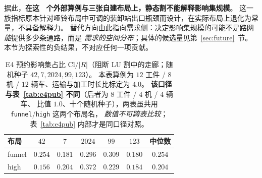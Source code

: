 据此，\textbf{在这 \NPubInst\ 个外部算例与三张自建布局上，静态割不能解释影响集规模}。
这一族指标原本针对哑铃布局中可调的装卸站出口瓶颈而设计，在实际布局上退化为常量，不具备解释力。
替代方向由此指向需求侧：决定影响集规模的可能不是路网\emph{能}提供多少条通路，而是
\emph{需求的空间分布}；具体的候选量见第~\ref{sec:future}~节。
本节为探索性的负结果，不对应任何一项贡献。

\begin{table}[t]
\centering
\caption{E4 预约影响集占比 \(\mathrm{Cl}/|R|\)（阻断 LU 割中的走廊；随机种子 \(42,7,2024,99,123\)）。
本表算例为 \(12\) 工件 / \(8\) 机 / \(12\) 辆车、运输与加工时长比标定为 \(4.0\)。
\textbf{该口径与表~\ref{tab:e4pub} 不同}（后者为 \(8\) 工件 / \(4\) 机 / \(4\) 辆车、
比值 \(1.0\)、十个随机种子），两表虽共用 \texttt{funnel}/\texttt{high} 这两个布局名，
\emph{数值不可跨表比较}；表~\ref{tab:e4pub} 内部才是同口径对照。}
\label{tab:e4}
\small
\begin{tabular}{@{}lcccccc@{}}
\toprule
布局 & \(42\) & \(7\) & \(2024\) & \(99\) & \(123\) & 中位数 \\
\midrule
funnel & \(0.254\) & \(0.181\) & \(0.296\) & \(0.309\) & \(0.180\) & \(0.254\) \\
high & \(0.156\) & \(0.204\) & \(0.372\) & \(0.229\) & \(0.184\) & \(0.204\) \\
\bottomrule
\end{tabular}
\end{table}


